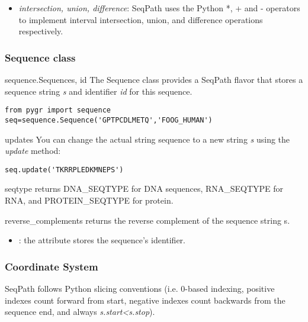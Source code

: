 \documentclass{howto}
\begin{document}
\begin{itemize}
\item
{\em intersection, union, difference}: SeqPath uses the Python *, + and - 
operators to implement interval intersection, union, and difference
operations respectively.

\end{itemize}


\subsubsection{Sequence class}

\begin{funcdesc}{sequence.Sequence}{s, id}
  The Sequence class provides a SeqPath flavor that stores a sequence string
  {\em s} and identifier {\em id} for this sequence.

\begin{verbatim}
from pygr import sequence
seq=sequence.Sequence('GPTPCDLMETQ','FOOG_HUMAN')
\end{verbatim}
\end{funcdesc}


\begin{funcdesc}{update}{s}
  You can change the actual string sequence to a new string {\em s}
  using the {\em update} method:

\begin{verbatim}
seq.update('TKRRPLEDKMNEPS')
\end{verbatim}
\end{funcdesc}

\begin{funcdesc}{seqtype}{}
  returns DNA_SEQTYPE for DNA sequences, 
  RNA_SEQTYPE for RNA, and PROTEIN_SEQTYPE for protein.
\end{funcdesc}


\begin{funcdesc}{reverse_complement}{s}
  returns the reverse complement of the sequence string s.
\end{funcdesc}


\begin{itemize}
\item
{}: the  attribute stores the sequence's identifier.

\end{itemize}

\subsubsection{Coordinate System}
SeqPath follows Python slicing conventions (i.e. 0-based indexing, positive indexes
count forward from start, negative indexes count backwards from the sequence
end, and always {\em s.start<s.stop}).
\end{document}
